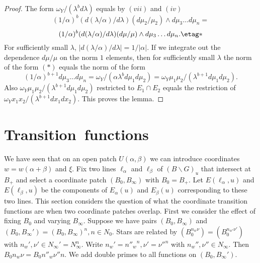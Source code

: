 \documentclass{memo-l}
\theoremstyle{definition}
\theoremstyle{remark}
\numberwithin{section}{chapter}
\numberwithin{equation}{chapter}
\begin{document}
\begin{proof}
   The form ${\omega}_{Y}/({\lambda}^{b}d{\lambda})$ equals by $(vii)$ and
$(iv)$
$$
(1/{\alpha})^{b}(d({\lambda}/{\alpha})/d{\lambda})(d{\mu}_{2}/{\mu}_{2})\wedge
d{\mu}_{3}\ldots d{\mu}_{n} =
$$
$$
(1/{\alpha})^{b}(d({\lambda}/{\alpha})/d{\lambda})(d{\mu}/{\mu})\wedge
d{\mu}_{3}\ldots d{\mu}_{n} . \etag *
$$
For sufficiently small ${\lambda}$, $\vert
d({\lambda}/{\alpha})/d{\lambda}\vert = 1/\vert {\alpha}\vert .$ If we
integrate out the dependence $d{\mu}/{\mu}$ on the norm $1$ elements, then
for sufficiently small ${\lambda}$ the norm of the form $(*)$ equals the
norm of the form
$$
(1/{\alpha})^{b+1}d{\mu}_{3}\ldots d{\mu}_{n} =
{\omega}_{Y}/({\alpha}{\lambda}^{b}d{\mu}_{1}d{\mu}_{2}) =
{\omega}_{Y}{\mu}_{1}{\mu}_{2}/({\lambda}^{b+1}d{\mu}_{1}d{\mu}_{2}).
$$
Also ${\omega}_{Y}{\mu}_{1}{\mu}_{2}/({\lambda}^{b+1}d{\mu}_{1}d{\mu}_{2})$
restricted to $E_{1} \cap E_{2}$ equals the restriction of
\newline
${\omega}_{Y}x_{1}x_{2}/({\lambda}^{b+1}dx_{1}dx_{2})$.  This proves the
lemma.
\end{proof}

\section{Transition\ functions}

   We have seen that on an open patch $U({\alpha},{\beta})$ we can
introduce coordinates $w = w({\alpha}+{\beta})$ and ${\xi}$.  Fix two lines
${\ell}_{{\alpha}}$ and ${\ell}_{{\beta}}$ of $(B\backslash G)_{u}$ that
intersect at $B_{+}$ and select a coordinate patch $(B_{0},B_{{\infty}})$
with $B_{0} = B_{+}$.  Let $E({\ell}_{{\alpha}},u)$ and
$E({\ell}_{{\beta}},u)$ be the components of $E_{{\alpha}}(u)$ and
$E_{{\beta}}(u)$ corresponding to these two lines.  This section considers
the question of what the coordinate transition functions are when two
coordinate patches overlap.  First we consider the effect of fixing $B_{0}$
and varying $B_{{\infty}}$.  Suppose we have pairs $(B_{0},B_{{\infty}})$
and $(B_{0},B_{{\infty}}') = (B_{0},B_{{\infty}})^{n}, n  \in  N_{0}$.
Stars are related by $(B_{0}^{n_w\nu}) = (B_{0}^{n_{w'}\nu'})$ with
$n_{w}', {\nu}' \in N_{{\infty}}' =
N_{{\infty}}^{n}$.  Write $n_{w}' = {n''_w}^n, {\nu}' = {\nu''}^{n}$ with
$n_{w}'', {\nu''} \in  N_{{\infty}}$.  Then $B_{0}n_{w}{\nu} =
B_{0}n''_{w}{\nu''}n$.  We add double primes to all functions on
$(B_{0},B_{{\infty}}')$.
\end{document}
